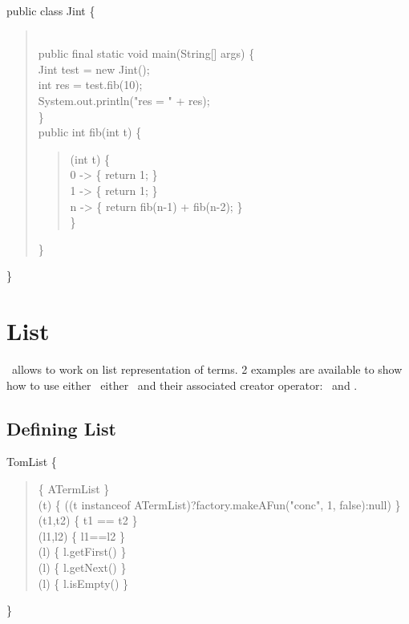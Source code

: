 public class Jint \{\\
\begin{quote}
  \typeint\\
  public final static void main(String[] args) \{\\
    Jint test = new Jint();\\
    int res = test.fib(10);\\
    System.out.println("res = " + res);\\
  \}\\
  public int fib(int t) \{\\
\begin{quote}
    \match(\textsf{int t}) \{\\
      \textsf{0} -> \{ return 1; \}\\
      \textsf{1} -> \{ return 1; \}\\
      \textsf{n} -> \{ return fib(n-1) + fib(n-2); \}\\
    \}\\
\end{quote}
  \}\\
\end{quote}
\}\\

\section{List}

\TOM\ allows to work on list representation of terms.
2 examples are available to show how to use either \typelist\ either \typearray\ and their
associated creator operator: \oplist\ and \oparray.

\subsection{Defining List}

\typelist TomList \{\\
\begin{quote}
    \implement \{ ATermList \}\\
    \getfs(t) \{ ((t instanceof ATermList)?factory.makeAFun("conc", 1, false):null) \}\\
    \cmpfs(t1,t2) \{ t1 == t2 \}\\
    \equals(l1,l2) \{ l1==l2 \}\\
    \geth(l)   \{ l.getFirst() \}\\
    \gett(l)   \{ l.getNext() \}\\
    \isempty(l)   \{ l.isEmpty() \}\\
\end{quote}
  \}\\

